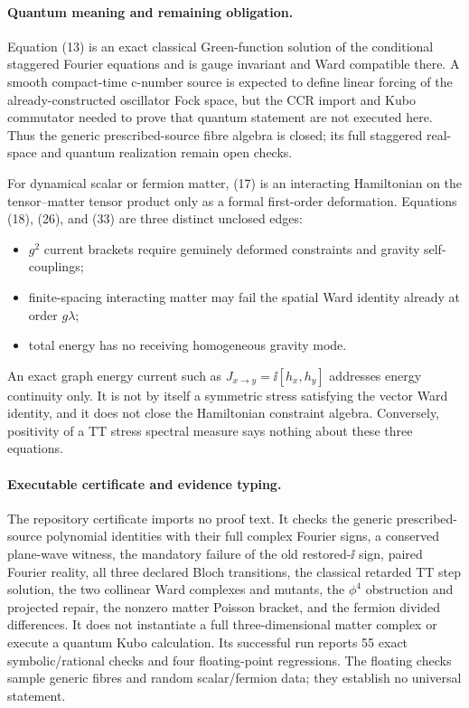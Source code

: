 \paragraph{Quantum meaning and remaining obligation.}

Equation (13) is an exact classical Green-function solution of the conditional
staggered Fourier equations and is gauge invariant and Ward compatible there.  A
smooth compact-time c-number source is expected to define linear forcing of
the already-constructed oscillator Fock space, but the CCR import and Kubo
commutator needed to prove that quantum statement are not executed here.  Thus
the generic prescribed-source fibre algebra is closed; its full staggered
real-space and quantum realization remain open checks.

For dynamical scalar or fermion matter, (17) is an interacting Hamiltonian on
the tensor--matter tensor product only as a formal first-order deformation.
Equations (18), (26), and (33) are three distinct unclosed edges:
\begin{itemize}[leftmargin=2em]
\item $g^2$ current brackets require genuinely deformed constraints and
gravity self-couplings;
\item finite-spacing interacting matter may fail the spatial Ward identity
already at order $g\lambda$;
\item total energy has no receiving homogeneous gravity mode.
\end{itemize}
An exact graph energy current such as $J_{x\to y}=\ii[h_x,h_y]$ addresses
energy continuity only.  It is not by itself a symmetric stress satisfying
the vector Ward identity, and it does not close the Hamiltonian constraint
algebra.  Conversely, positivity of a TT stress spectral measure says nothing
about these three equations.

\paragraph{Executable certificate and evidence typing.}

The repository certificate  imports no proof text.
It checks the generic prescribed-source polynomial identities with their full
complex Fourier signs, a conserved plane-wave witness, the mandatory failure
of the old restored-$\ii$ sign, paired Fourier reality, all three declared
Bloch transitions, the classical retarded TT step solution, the two
collinear Ward complexes and mutants, the $\phi^4$ obstruction and projected
repair, the nonzero matter Poisson bracket, and the fermion divided differences.
It does not instantiate a full three-dimensional matter complex or execute a
quantum Kubo calculation.  Its successful run reports 55 exact
symbolic/rational checks and four floating-point regressions.  The floating
checks sample generic fibres and random scalar/fermion data; they establish no
universal statement.

